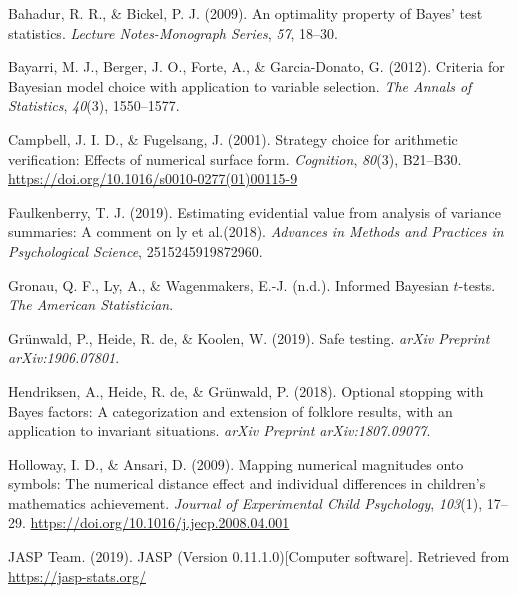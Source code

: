 \documentclass[english,,doc,floatsintext]{apa6}
\begin{document}
\setlength{\parindent}{-0.5in}
\setlength{\leftskip}{0.5in}

\hypertarget{refs}{}
\leavevmode\hypertarget{ref-bahadur2009optimality}{}%
Bahadur, R. R., \& Bickel, P. J. (2009). An optimality property of Bayes' test statistics. \emph{Lecture Notes-Monograph Series}, \emph{57}, 18--30.

\leavevmode\hypertarget{ref-bayarri2012criteria}{}%
Bayarri, M. J., Berger, J. O., Forte, A., \& Garcia-Donato, G. (2012). Criteria for Bayesian model choice with application to variable selection. \emph{The Annals of Statistics}, \emph{40}(3), 1550--1577.

\leavevmode\hypertarget{ref-campbellFugelsang2001}{}%
Campbell, J. I. D., \& Fugelsang, J. (2001). Strategy choice for arithmetic verification: Effects of numerical surface form. \emph{Cognition}, \emph{80}(3), B21--B30. \url{https://doi.org/10.1016/s0010-0277(01)00115-9}

\leavevmode\hypertarget{ref-faulkenberry2019estimating}{}%
Faulkenberry, T. J. (2019). Estimating evidential value from analysis of variance summaries: A comment on ly et al.(2018). \emph{Advances in Methods and Practices in Psychological Science}, 2515245919872960.

\leavevmode\hypertarget{ref-gronauInpressinformed}{}%
Gronau, Q. F., Ly, A., \& Wagenmakers, E.-J. (n.d.). Informed Bayesian \(t\)-tests. \emph{The American Statistician}.

\leavevmode\hypertarget{ref-grunwald2019safe}{}%
Grünwald, P., Heide, R. de, \& Koolen, W. (2019). Safe testing. \emph{arXiv Preprint arXiv:1906.07801}.

\leavevmode\hypertarget{ref-hendriksen2018optional}{}%
Hendriksen, A., Heide, R. de, \& Grünwald, P. (2018). Optional stopping with Bayes factors: A categorization and extension of folklore results, with an application to invariant situations. \emph{arXiv Preprint arXiv:1807.09077}.

\leavevmode\hypertarget{ref-hollowayAnsari2009}{}%
Holloway, I. D., \& Ansari, D. (2009). Mapping numerical magnitudes onto symbols: The numerical distance effect and individual differences in children's mathematics achievement. \emph{Journal of Experimental Child Psychology}, \emph{103}(1), 17--29. \url{https://doi.org/10.1016/j.jecp.2008.04.001}

\leavevmode\hypertarget{ref-jaspSoftware}{}%
JASP Team. (2019). JASP (Version 0.11.1.0){[}Computer software{]}. Retrieved from \url{https://jasp-stats.org/}
\end{document}
